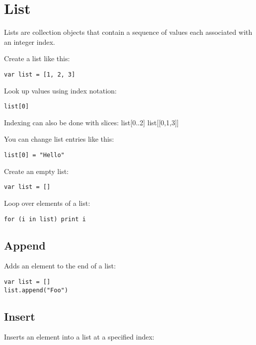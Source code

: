 \hypertarget{list}{%
\section{List}\label{list}}

Lists are collection objects that contain a sequence of values each
associated with an integer index.

Create a list like this:

\begin{lstlisting}
var list = [1, 2, 3]
\end{lstlisting}

Look up values using index notation:

\begin{lstlisting}
list[0]
\end{lstlisting}

Indexing can also be done with slices: list{[}0..2{]}
list{[}{[}0,1,3{]}{]}

You can change list entries like this:

\begin{lstlisting}
list[0] = "Hello"
\end{lstlisting}

Create an empty list:

\begin{lstlisting}
var list = []
\end{lstlisting}

Loop over elements of a list:

\begin{lstlisting}
for (i in list) print i
\end{lstlisting}

\hypertarget{append}{%
\subsection{Append}\label{append}}

Adds an element to the end of a list:

\begin{lstlisting}
var list = []
list.append("Foo")
\end{lstlisting}

\hypertarget{insert}{%
\subsection{Insert}\label{insert}}

Inserts an element into a list at a specified index:

